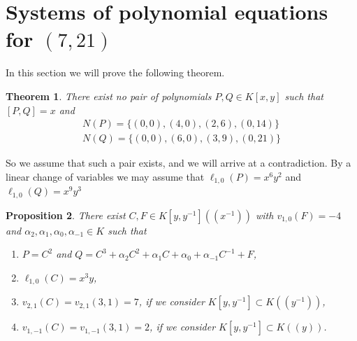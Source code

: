 \documentclass[reqno,a4paper,twoside]{amsart}
\newtheorem{theorem}{Theorem}[section]
\newtheorem{proposition}[theorem]{Proposition}
\theoremstyle{definition}
\theoremstyle{remark}
\begin{document}
\section{Systems of polynomial equations for $(7,21)$}
\label{seccion 5}
In this section we will prove the following theorem.
\begin{theorem}\label{teorema impossible para 7}
There exist no pair of polynomials $P,Q\in K[x,y]$ such that $[P,Q] = x$ and
\begin{align*}
	N(P) = \{(0,0),(4,0),(2,6), (0,14)\} \\
	N(Q) = \{(0,0),(6,0),(3,9), (0,21)\}
\end{align*}	
\end{theorem}

So we assume that such a pair exists, and we will  arrive at a contradiction.
By a linear change of variables we may assume that $\ell_{1,0}(P)=x^6 y^2$ and $\ell_{1,0}(Q)=x^9 y^3$

\begin{proposition}\label{calculo de C para 7}
 There exist $C,F\in K[y,y^{-1}]((x^{-1}))$
with $v_{1,0}(F)=-4$ and $\alpha_2,\alpha_1,\alpha_0,\alpha_{-1}\in K$ such that
  \begin{enumerate}
    \item $P=C^2$ and $Q=C^3 +\alpha_2 C^2+\alpha_1 C+\alpha_0+\alpha_{-1}C^{-1}+F$,
    \item $\ell_{1,0}(C)=x^3 y$,
    \item $v_{2,1}(C)=v_{2,1}(3,1)=7$, if we consider $K[y,y^{-1}]\subset K((y^{-1}))$,
  \item $v_{1,-1}(C)=v_{1,-1}(3,1)=2$, if we consider $K[y,y^{-1}]\subset K((y))$.
  \end{enumerate}
\end{proposition}
\end{document}
